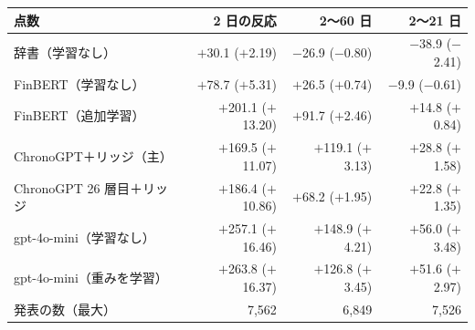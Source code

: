 \begin{tabular}{@{}lrrr@{}}
\toprule
点数 & 2 日の反応 & 2〜60 日 & 2〜21 日 \\
\midrule
辞書（学習なし） & $+$30.1 ($+$2.19) & $-$26.9 ($-$0.80) & $-$38.9 ($-$2.41) \\
FinBERT（学習なし） & $+$78.7 ($+$5.31) & $+$26.5 ($+$0.74) & $-$9.9 ($-$0.61) \\
FinBERT（追加学習） & $+$201.1 ($+$13.20) & $+$91.7 ($+$2.46) & $+$14.8 ($+$0.84) \\
ChronoGPT＋リッジ（主） & $+$169.5 ($+$11.07) & $+$119.1 ($+$3.13) & $+$28.8 ($+$1.58) \\
ChronoGPT 26 層目＋リッジ & $+$186.4 ($+$10.86) & $+$68.2 ($+$1.95) & $+$22.8 ($+$1.35) \\
gpt-4o-mini（学習なし） & $+$257.1 ($+$16.46) & $+$148.9 ($+$4.21) & $+$56.0 ($+$3.48) \\
gpt-4o-mini（重みを学習） & $+$263.8 ($+$16.37) & $+$126.8 ($+$3.45) & $+$51.6 ($+$2.97) \\
\midrule
発表の数（最大） & 7,562 & 6,849 & 7,526 \\
\bottomrule
\end{tabular}
